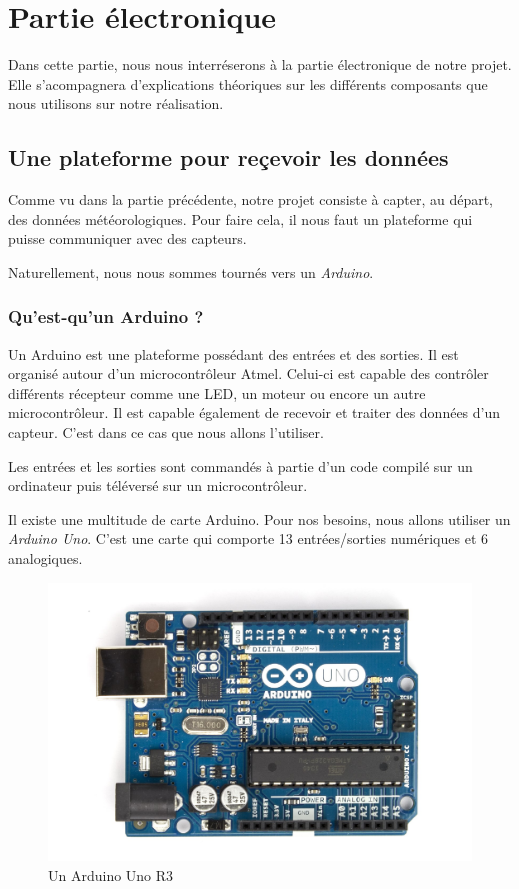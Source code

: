 \chapter{Partie électronique}

Dans cette partie, nous nous interréserons à la partie électronique de notre projet. Elle s'acompagnera d'explications théoriques sur les différents composants que nous utilisons sur notre réalisation.

\section{Une plateforme pour reçevoir les données}

Comme vu dans la partie précédente, notre projet consiste à capter, au départ, des données météorologiques. Pour faire cela, il nous faut un plateforme qui puisse communiquer avec des capteurs.

Naturellement, nous nous sommes tournés vers un \emph{Arduino}.

\subsection{Qu'est-qu'un Arduino ?}

Un Arduino est une plateforme possédant des entrées et des sorties. Il est organisé autour d'un microcontrôleur Atmel. Celui-ci est capable des contrôler différents récepteur comme une LED, un moteur ou encore un autre microcontrôleur. Il est capable également de recevoir et traiter des données d'un capteur. C'est dans ce cas que nous allons l'utiliser.

Les entrées et les sorties sont commandés à partie d'un code compilé sur un ordinateur puis téléversé sur un microcontrôleur.

Il existe une multitude de carte Arduino. Pour nos besoins, nous allons utiliser un \emph{Arduino Uno}. C'est une carte qui comporte 13 entrées/sorties numériques et 6 analogiques.

\begin{figure}[!h]
	\centering
	\includegraphics[width=.4\linewidth]{Images/Arduino_Uno}
	\caption{Un Arduino Uno R3}
\end{figure}

